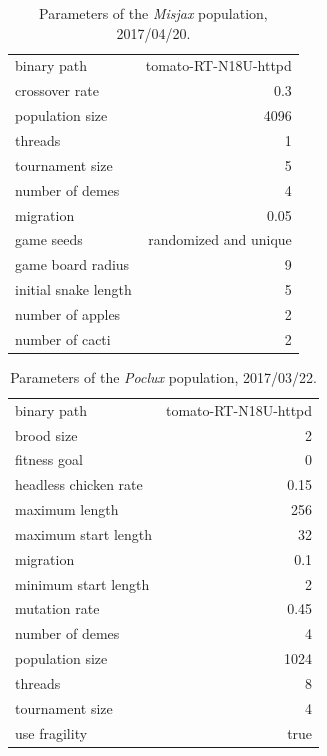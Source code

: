 \documentclass[12pt,glossary]{dalthesis}
\begin{document}
\begin{table}[htbp]
\caption{Parameters of the \emph{Misjax} population, 2017/04/20.}
\centering
\begin{tabular}{lr}
binary path & tomato-RT-N18U-httpd\\
crossover rate & 0.3\\
population size & 4096\\
threads & 1\\
tournament size & 5\\
number of demes & 4\\
migration & 0.05\\
game seeds & randomized and unique\\
game board radius & 9\\
initial snake length & 5\\
number of apples & 2\\
number of cacti & 2\\
\end{tabular}
\end{table}


\begin{table}[htbp]
\caption{Parameters of the \emph{Poclux} population, 2017/03/22.}
\centering
\begin{tabular}{lr}
binary path & tomato-RT-N18U-httpd\\
brood size & 2\\
fitness goal & 0\\
headless chicken rate & 0.15\\
maximum length & 256\\
maximum start length & 32\\
migration & 0.1\\
minimum start length & 2\\
mutation rate & 0.45\\
number of demes & 4\\
population size & 1024\\
threads & 8\\
tournament size & 4\\
use fragility & true\\
\end{tabular}
\end{table}
\end{document}
